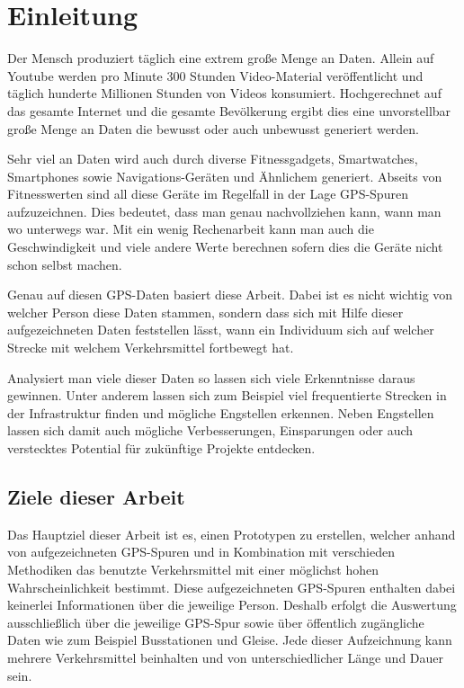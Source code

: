 \chapter{Einleitung}
Der Mensch produziert täglich eine extrem große Menge an Daten. Allein auf Youtube werden pro Minute 300 Stunden Video-Material veröffentlicht und täglich hunderte Millionen Stunden von Videos konsumiert.  \cite{youtube_statistics_2015} Hochgerechnet auf das gesamte Internet und die gesamte Bevölkerung ergibt dies eine unvorstellbar große Menge an Daten die bewusst oder auch unbewusst generiert werden. 

Sehr viel an Daten wird auch durch diverse Fitnessgadgets, Smartwatches, Smartphones sowie Navigations-Geräten und Ähnlichem generiert. Abseits von Fitnesswerten sind all diese Geräte im Regelfall in der Lage GPS-Spuren aufzuzeichnen. Dies bedeutet, dass man genau nachvollziehen kann, wann man wo unterwegs war. Mit ein wenig Rechenarbeit kann man auch die Geschwindigkeit und viele andere Werte berechnen sofern dies die Geräte nicht schon selbst machen. 

Genau auf diesen GPS-Daten basiert diese Arbeit. Dabei ist es nicht wichtig von welcher Person diese Daten stammen, sondern dass sich mit Hilfe dieser aufgezeichneten Daten feststellen lässt, wann ein Individuum sich auf welcher Strecke mit welchem Verkehrsmittel fortbewegt hat.

Analysiert man viele dieser Daten so lassen sich viele Erkenntnisse daraus gewinnen. Unter anderem lassen sich zum Beispiel viel frequentierte Strecken in der Infrastruktur finden und mögliche Engstellen erkennen. Neben Engstellen lassen sich damit auch mögliche Verbesserungen, Einsparungen oder auch verstecktes Potential für zukünftige Projekte entdecken.

\section{Ziele dieser Arbeit}
Das Hauptziel dieser Arbeit ist es, einen Prototypen zu erstellen, welcher anhand von aufgezeichneten GPS-Spuren und in Kombination mit verschieden Methodiken das benutzte Verkehrsmittel mit einer möglichst hohen Wahrscheinlichkeit bestimmt. Diese aufgezeichneten GPS-Spuren enthalten dabei keinerlei Informationen über die jeweilige Person. Deshalb erfolgt die Auswertung ausschließlich über die jeweilige GPS-Spur sowie über öffentlich zugängliche Daten wie zum Beispiel Busstationen und Gleise. Jede dieser Aufzeichnung kann mehrere Verkehrsmittel beinhalten und von unterschiedlicher Länge und Dauer sein.

